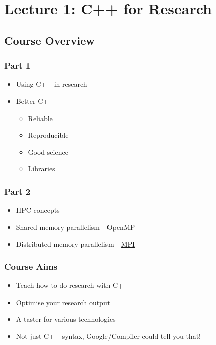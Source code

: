 \section{Lecture 1: C++ for Research}\label{lecture-1-c-for-research}

\subsection{Course Overview}\label{course-overview}

\subsubsection{Part 1}\label{part-1}

\begin{itemize}
\itemsep1pt\parskip0pt
\item
  Using C++ in research
\item
  Better C++

  \begin{itemize}
  \itemsep1pt\parskip0pt
  \item
    Reliable
  \item
    Reproducible
  \item
    Good science
  \item
    Libraries
  \end{itemize}
\end{itemize}

\subsubsection{Part 2}\label{part-2}

\begin{itemize}
\itemsep1pt\parskip0pt
\item
  HPC concepts
\item
  Shared memory parallelism - \href{http://www.openmp.org}{OpenMP}
\item
  Distributed memory parallelism - \href{http://www.open-mpi.org}{MPI}
\end{itemize}

\subsubsection{Course Aims}\label{course-aims}

\begin{itemize}
\itemsep1pt\parskip0pt
\item
  Teach how to do research with C++
\item
  Optimise your research output
\item
  A taster for various technologies
\item
  Not just C++ syntax, Google/Compiler could tell you that!
\end{itemize}

